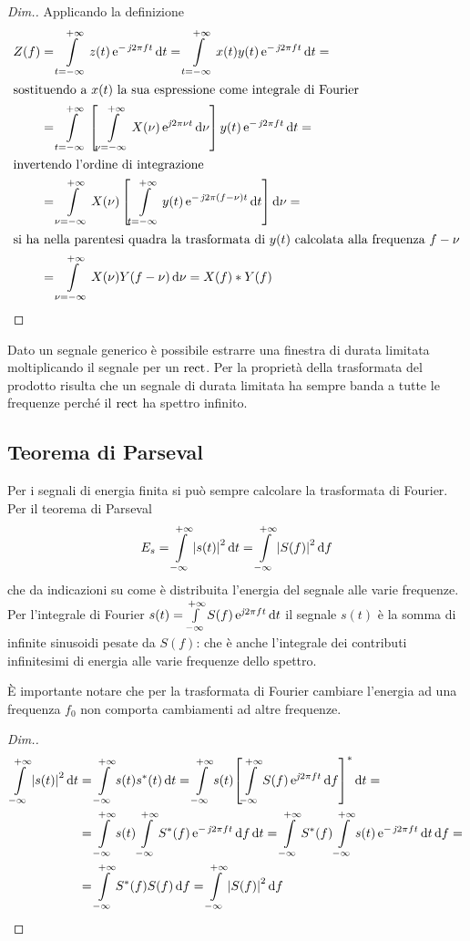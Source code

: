 \begin{proof}[Dim.] Applicando la definizione
\[\begin{split}Z(f)&=\intd{t=-\infty}{+\infty}{z(t)\e{-\imath 2\pi f t}}{t}=\intd{t=-\infty}{+\infty}{x(t)y(t)\e{-\imath 2\pi f t}}{t}=\\
\intertext{sostituendo a $x(t)$ la sua espressione come integrale di Fourier}
&=\intd{t=-\infty}{+\infty}{\left[\intd{\nu=-\infty}{+\infty}{X(\nu)\e{\imath 2\pi\nu t}}{\nu}\right]y(t)\e{-\imath 2\pi f t}}{t}=\\
\intertext{invertendo l'ordine di integrazione}
&=\intd{\nu=-\infty}{+\infty}{X(\nu)\left[\intd{t=-\infty}{+\infty}{y(t)\e{-\imath 2\pi(f-\nu)t}}{t}\right]}{\nu}=\\
\intertext{si ha nella parentesi quadra la trasformata di $y(t)$ calcolata alla frequenza $f-\nu$}
&=\intd{\nu=-\infty}{+\infty}{X(\nu)Y(f-\nu)}{\nu} = X(f)\ast Y(f)
\end{split}\]
\end{proof}

\begin{nota}
Dato un segnale generico è possibile estrarre una finestra di durata limitata moltiplicando il segnale per un $\operatorname{rect}$. Per la proprietà della trasformata del prodotto risulta che un segnale di durata limitata ha sempre banda a tutte le frequenze perché il $\operatorname{rect}$ ha spettro infinito.
\end{nota}

\subsection{Teorema di Parseval}
Per i segnali di energia finita si può sempre calcolare la trasformata di Fourier. Per il teorema di Parseval
\begin{equation}E_s=\int\limits_{-\infty}^{+\infty}{\left|{s(t)}\right|^2}{\,\mathop{}\!\mathrm{d}{t}}=\int\limits_{-\infty}^{+\infty}{\left|{S(f)}\right|^2}{\,\mathop{}\!\mathrm{d}{f}}\label{eq:parseval}\end{equation}
che da indicazioni su come è distribuita l'energia del segnale alle varie frequenze. Per l'integrale di Fourier $s(t)=\int\limits_{-\infty}^{+\infty}{S(f)\operatorname{e}^{\operatorname{\mathit{j}\!} 2\pi f t}}{\,\mathop{}\!\mathrm{d}{t}}$ il segnale $s(t)$ è la somma di infinite sinusoidi pesate da $S(f)$: che è anche l'integrale dei contributi infinitesimi di energia alle varie frequenze dello spettro.
\begin{nota}\`{E} importante notare che per la trasformata di Fourier cambiare l'energia ad una frequenza $f_0$ non comporta cambiamenti ad altre frequenze.\end{nota}
\begin{proof}[Dim.]
\[\begin{split}\intinf{\abs{s(t)}^2}{t}&=\intinf{s(t)\conj{s}(t)}{t}
=\intinf{s(t)\conj{\left[\intinf{S(f)\e{\imath 2\pi f t}}{f}\right]}}{t}=\\
&=\intinf{s(t)\intinf{\conj{S}(f)\e{-\imath 2\pi f t}}{f}}{t}=\intinf{\conj{S}(f)\intinf{s(t)\e{-\imath 2\pi f t}}{t}}{f}=\\
&=\intinf{\conj{S}(f)S(f)}{f}=\intinf{\abs{S(f)}^2}{f}\end{split}\]
\end{proof}

